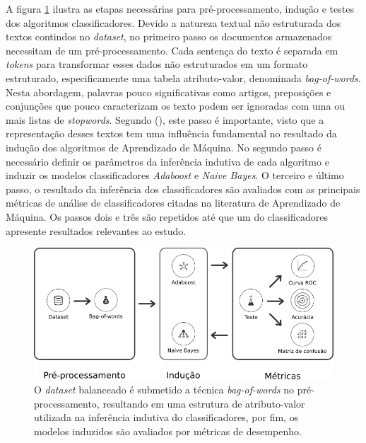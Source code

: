 A figura \ref{figure:metodologia_3} ilustra as etapas necessárias para 
pré-processamento, indução e testes dos algoritmos classificadores. Devido a 
natureza textual não estruturada dos textos contindos no \textit{dataset}, no 
primeiro passo os documentos armazenados necessitam de um pré-processamento. 
Cada sentença do texto é separada em \textit{tokens} para transformar esses 
dados não estruturados em um formato estruturado, especificamente uma tabela 
atributo-valor, denominada \textit{bag-of-words}. Nesta abordagem, palavras 
pouco significativas como artigos, preposições e conjunções que pouco 
caracterizam os texto podem ser ignoradas com uma ou mais listas de 
\textit{stopwords}. Segundo  
(\citeyear{matsubara2003pretext}), este passo é importante, visto que a 
representação desses textos tem uma influência fundamental no resultado da 
indução dos algoritmos de Aprendizado de Máquina. No segundo passo é 
necessário definir os parâmetros da inferência indutiva de cada algoritmo e 
induzir os modelos classificadores \textit{Adaboost} e \textit{Naive Bayes}. 
O terceiro e último passo, o resultado da inferência dos classificadores são 
avaliados com as principais métricas de análise de classificadores citadas na 
literatura de Aprendizado de Máquina. Os passos dois e três são repetidos até 
que um do classificadores apresente resultados relevantes ao estudo.

\begin{figure}[H]
\begin{center}
    \includegraphics[scale=0.70]{images/metodologia_3.png}
\end{center}
\caption{O \textit{dataset} balanceado é submetido a técnica 
\textit{bag-of-words} no pré-processamento, resultando em uma estrutura de 
atributo-valor utilizada na inferência indutiva do classificadores, por fim, os 
modelos induzidos são avaliados por métricas de desempenho.}
\label{figure:metodologia_3}
\end{figure}